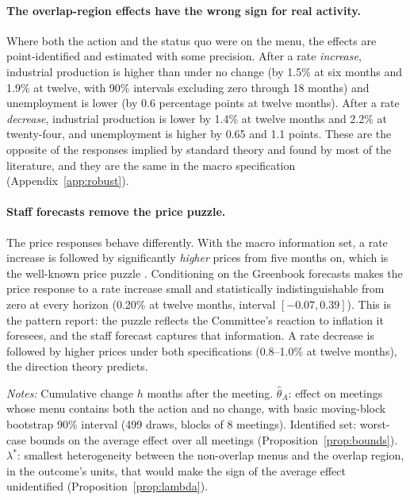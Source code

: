 \paragraph{The overlap-region effects have the wrong sign for real activity.} Where both the action and the status
quo were on the menu, the effects are point-identified and estimated with some precision. After a rate
\emph{increase}, industrial production is higher than under no change (by 1.5\% at six months and 1.9\% at twelve,
with 90\% intervals excluding zero through 18 months) and unemployment is lower (by 0.6 percentage points at twelve
months). After a rate \emph{decrease}, industrial production is lower by 1.4\% at twelve months and 2.2\% at
twenty-four, and unemployment is higher by 0.65 and 1.1 points. These are the opposite of the responses implied by
standard theory and found by most of the literature, and they are the same in the macro specification
(Appendix~\ref{app:robust}).

\paragraph{Staff forecasts remove the price puzzle.} The price responses behave differently. With the macro
information set, a rate increase is followed by significantly \emph{higher} prices from five months on, which is the
well-known price puzzle \citep{sims1992}. Conditioning on the Greenbook forecasts makes the price response to a rate increase
small and statistically indistinguishable from zero at every horizon (0.20\% at twelve months, interval
$[-0.07,0.39]$). This is the pattern \citet{romer2004} report: the puzzle reflects the Committee's reaction to
inflation it foresees, and the staff forecast captures that information. A rate decrease is followed by higher
prices under both specifications (0.8--1.0\% at twelve months), the direction theory predicts.

\begin{table}[!htbp]
  \centering
  \caption{Effects of rate changes relative to no change, Greenbook information set}\label{tab:results}
  \footnotesize
  \par\medskip
  \begin{minipage}{0.86\linewidth}\footnotesize
  \emph{Notes:} Cumulative change $h$ months after the meeting. $\hat\theta_A$: effect on meetings whose menu contains
  both the action and no change, with basic moving-block bootstrap 90\% interval (499 draws, blocks of 8 meetings).
  Identified set: worst-case bounds on the average effect over all meetings (Proposition~\ref{prop:bounds}).
  $\lambda^\ast$: smallest heterogeneity between the non-overlap menus and the overlap region, in the outcome's
  units, that would make the sign of the average effect unidentified (Proposition~\ref{prop:lambda}).
  \end{minipage}
\end{table}

